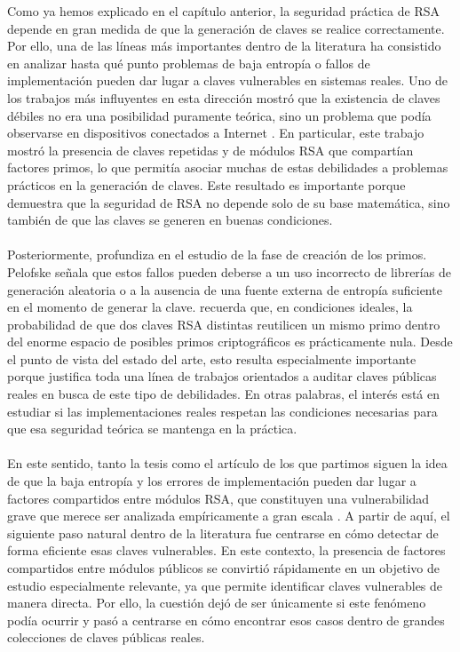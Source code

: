 Como ya hemos explicado en el capítulo anterior, la seguridad práctica de RSA depende en gran medida de que la generación de claves se realice correctamente. Por ello, una de las líneas más importantes dentro de la literatura ha consistido en analizar hasta qué punto problemas de baja entropía o fallos de implementación pueden dar lugar a claves vulnerables en sistemas reales. Uno de los trabajos más influyentes en esta dirección mostró que la existencia de claves débiles no era una posibilidad puramente teórica, sino un problema que podía observarse en dispositivos conectados a Internet \citep{heninger2012mining}. En particular, este trabajo mostró la presencia de claves repetidas y de módulos RSA que compartían factores primos, lo que permitía asociar muchas de estas debilidades a problemas prácticos en la generación de claves. Este resultado es importante porque demuestra que la seguridad de RSA no depende solo de su base matemática, sino también de que las claves se generen en buenas condiciones.
\\
\\
Posteriormente, \citet{pelofske2024efficient} profundiza en el estudio de la fase de creación de los primos. Pelofske señala que estos fallos pueden deberse a un uso incorrecto de librerías de generación aleatoria o a la ausencia de una fuente externa de entropía suficiente en el momento de generar la clave. \citet{vage2022finding} recuerda que, en condiciones ideales, la probabilidad de que dos claves RSA distintas reutilicen un mismo primo dentro del enorme espacio de posibles primos criptográficos es prácticamente nula. Desde el punto de vista del estado del arte, esto resulta especialmente importante porque justifica toda una línea de trabajos orientados a auditar claves públicas reales en busca de este tipo de debilidades. En otras palabras, el interés está en estudiar si las implementaciones reales respetan las condiciones necesarias para que esa seguridad teórica se mantenga en la práctica.
\\
\\
En este sentido, tanto la tesis como el artículo de los que partimos siguen la idea de que la baja entropía y los errores de implementación pueden dar lugar a factores compartidos entre módulos RSA, que constituyen una vulnerabilidad grave que merece ser analizada empíricamente a gran escala \citep{vage2022finding,pelofske2024efficient}. A partir de aquí, el siguiente paso natural dentro de la literatura fue centrarse en cómo detectar de forma eficiente esas claves vulnerables. En este contexto, la presencia de factores compartidos entre módulos públicos se convirtió rápidamente en un objetivo de estudio especialmente relevante, ya que permite identificar claves vulnerables de manera directa. Por ello, la cuestión dejó de ser únicamente si este fenómeno podía ocurrir y pasó a centrarse en cómo encontrar esos casos dentro de grandes colecciones de claves públicas reales.
